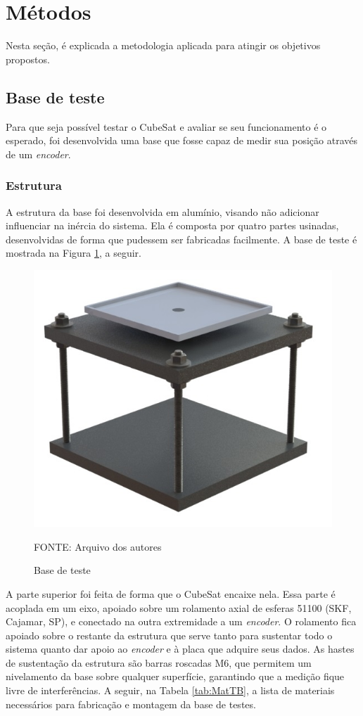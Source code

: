 \documentclass[
	12pt,				%
	openany,			%
	twoside,			%
	a4paper,			%
	english,			%
	french,				%
	spanish,			%
	brazil,				%
	oldfontcommands
	]{abntex2}
\begin{document}
\section[Métodos]{Métodos}

Nesta seção, é explicada a metodologia aplicada para atingir os objetivos propostos.

\subsection{Base de teste}

Para que seja possível testar o CubeSat e avaliar se seu funcionamento é o esperado, foi desenvolvida uma base que fosse capaz de medir sua posição através de um \textit{encoder}.

\subsubsection{Estrutura}

A estrutura da base foi desenvolvida em alumínio, visando não adicionar influenciar na inércia do sistema. Ela é composta por quatro partes usinadas, desenvolvidas de forma que pudessem ser fabricadas facilmente. A base de teste é mostrada na Figura \ref{fig:ProtoTB}, a seguir.

\begin{figure}[th]
	\caption{Base de teste}
	\centering
	\includegraphics[width=0.7\linewidth]{./figs/Test_Base}
	
	\begin{small}
		FONTE: Arquivo dos autores
	\end{small}
	\label{fig:ProtoTB}
\end{figure}

A parte superior foi feita de forma que o CubeSat encaixe nela. Essa parte é acoplada em um eixo, apoiado sobre um rolamento axial de esferas 51100 (SKF, Cajamar, SP), e conectado na outra extremidade a um \textit{encoder}. O rolamento fica apoiado sobre o restante da estrutura que serve tanto para sustentar todo o sistema quanto dar apoio ao \textit{encoder} e à placa que adquire seus dados. As hastes de sustentação da estrutura são barras roscadas M6, que permitem um nivelamento da base sobre qualquer superfície, garantindo que a medição fique livre de interferências. A seguir, na Tabela \ref{tab:MatTB}, a lista de materiais necessários para fabricação e montagem da base de testes.
\end{document}
